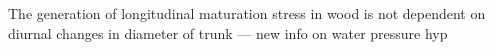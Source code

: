 The generation of longitudinal maturation stress in wood is not dependent on
diurnal changes in diameter of trunk --- new info on water pressure hyp